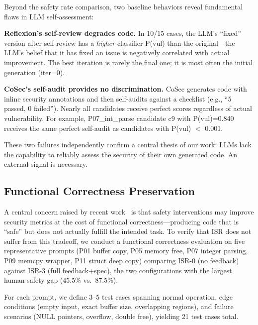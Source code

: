 \documentclass[sigconf,10pt]{acmart}
\begin{document}
Beyond the safety rate comparison, two baseline behaviors reveal fundamental flaws in LLM self-assessment:

\textbf{Reflexion's self-review degrades code.} In 10/15 cases, the LLM's ``fixed'' version after self-review has a \textit{higher} classifier P(vul) than the original---the LLM's belief that it has fixed an issue is negatively correlated with actual improvement. The best iteration is rarely the final one; it is most often the initial generation (iter=0).

\textbf{CoSec's self-audit provides no discrimination.} CoSec generates code with inline security annotations and then self-audits against a checklist (e.g., ``5 passed, 0 failed''). Nearly all candidates receive perfect scores regardless of actual vulnerability. For example, P07\_int\_parse candidate c9 with P(vul)=0.840 receives the same perfect self-audit as candidates with P(vul) $<$ 0.001.

These two failures independently confirm a central thesis of our work: LLMs lack the capability to reliably assess the security of their own generated code. An external signal is necessary.

\subsection{Functional Correctness Preservation}
\label{sec:functional}

A central concern raised by recent work~\cite{rethinking} is that safety interventions may improve security metrics at the cost of functional correctness---producing code that is ``safe'' but does not actually fulfill the intended task. To verify that ISR does not suffer from this tradeoff, we conduct a functional correctness evaluation on five representative prompts (P01 buffer copy, P05 memory free, P07 integer parsing, P09 memcpy wrapper, P11 struct deep copy) comparing ISR-0 (no feedback) against ISR-3 (full feedback+spec), the two configurations with the largest human safety gap (45.5\% vs.\ 87.5\%).

For each prompt, we define 3--5 test cases spanning normal operation, edge conditions (empty input, exact buffer size, overlapping regions), and failure scenarios (NULL pointers, overflow, double free), yielding 21 test cases total.
\end{document}
